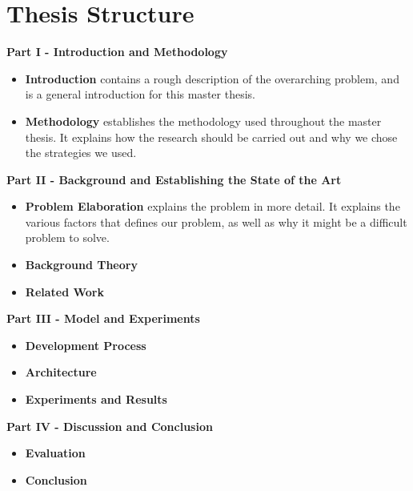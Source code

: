 
\section{Thesis Structure}
\noindent
\begin{minipage}{\linewidth}
    \textbf{Part I - Introduction and Methodology}
    \begin{itemize}
        \item\textbf{Introduction} contains a rough description of the overarching problem, and is a general introduction for this master thesis.
        \item\textbf{Methodology} establishes the methodology used throughout the master thesis. It explains how the research should be carried out and why we chose the strategies we used.
    \end{itemize}
\end{minipage}

\vspace{0.5cm}\noindent
\begin{minipage}{\linewidth}
    \textbf{Part II - Background and Establishing the State of the Art}
    \begin{itemize}
        \item\textbf{Problem Elaboration} explains the problem in more detail. It explains the various factors that defines our problem, as well as why it might be a difficult problem to solve.
        \item\textbf{Background Theory} 
        \item\textbf{Related Work} 
    \end{itemize}
\end{minipage}

\vspace{0.5cm}\noindent
\begin{minipage}{\linewidth}
    \textbf{Part III - Model and Experiments}
    \begin{itemize}
        \item\textbf{Development Process} 
        \item\textbf{Architecture} 
        \item\textbf{Experiments and Results} 
    \end{itemize}
\end{minipage}

\vspace{0.5cm}\noindent
\begin{minipage}{\linewidth}
    \textbf{Part IV - Discussion and Conclusion}
    \begin{itemize}
        \item\textbf{Evaluation} 
        \item\textbf{Conclusion} 
    \end{itemize}
\end{minipage}